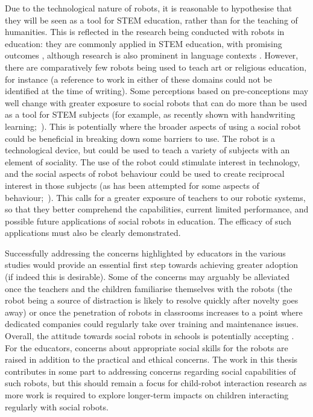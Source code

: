 Due to the technological nature of robots, it is reasonable to hypothesise that they will be seen as a tool for STEM education, rather than for the teaching of humanities. This is reflected in the research being conducted with robots in education: they are commonly applied in STEM education, with promising outcomes \cite{karim2015review}, although research is also prominent in language contexts \cite{hood2015children,kanda2004interactive,kennedy2016social,tanaka2012children}. However, there are comparatively few robots being used to teach art or religious education, for instance (a reference to work in either of these domains could not be identified at the time of writing). Some perceptions based on pre-conceptions may well change with greater exposure to social robots that can do more than be used as a tool for STEM subjects (for example, as recently shown with handwriting learning;~\citealp{hood2015children}). This is potentially where the broader aspects of using a social robot could be beneficial in breaking down some barriers to use. The robot is a technological device, but could be used to teach a variety of subjects with an element of sociality. The use of the robot could stimulate interest in technology, and the social aspects of robot behaviour could be used to create reciprocal interest in those subjects (as has been attempted for some aspects of behaviour;~\citealp{gordon2015curiosity}). This calls for a greater exposure of teachers to our robotic systems, so that they better comprehend the capabilities, current limited performance, and possible future applications of social robots in education. The efficacy of such applications must also be clearly demonstrated.

Successfully addressing the concerns highlighted by educators in the various studies would provide an essential first step towards achieving greater adoption (if indeed this is desirable). Some of the concerns may arguably be alleviated once the teachers and the children familiarise themselves with the robots (the robot being a source of distraction is likely to resolve quickly after novelty goes away) or once the penetration of robots in classrooms increases to a point where dedicated companies could regularly take over training and maintenance issues. Overall, the attitude towards social robots in schools is potentially accepting \citep{lee2008elementary,serholt2014teachers}. For the educators, concerns about appropriate social skills for the robots are raised in addition to the practical and ethical concerns. The work in this thesis contributes in some part to addressing concerns regarding social capabilities of such robots, but this should remain a focus for child-robot interaction research as more work is required to explore longer-term impacts on children interacting regularly with social robots.

